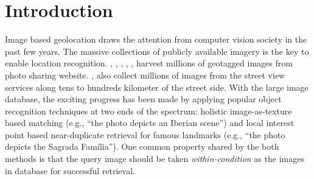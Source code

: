\section{Introduction}

\label{sec:intro}




Image based geolocation draws the attention from computer vision society in the past few years.  The massive collections of publicly available imagery is the key to enable location recognition.  \cite{Hays08}, \cite{Torralba08}, \cite{Li10}, \cite{Crandall09}, \cite{Xiao10}, \cite{Li10} harvest millions of geotagged images from photo sharing website.  \cite{Schindler07}, \cite{RoshanZamir10} also collect millions of images from the street view services along tens to hundreds kilometer of the street side.  With the large image database, the exciting progress has been made by applying popular object recognition techniques at two ends of the spectrum: holistic image-as-texture based matching (e.g., “the photo depicts an Iberian scene”) and local interest point based near-duplicate retrieval for famous landmarks (e.g., “the photo depicts the Sagrada Família”).  One common property shared by the both methods is that the query image should be taken \emph{within-condition} as the images in database for successful retrieval.


